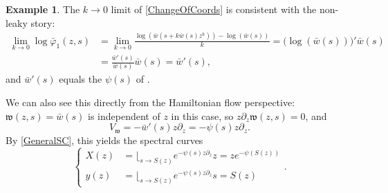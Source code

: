 \documentclass[10pt,a4paper,oneside,no-math,reqno]{amsart}%
\theoremstyle{plain}
\newtheorem{lemma}[theorem]{Lemma}
\theoremstyle{definition}
\newtheorem{example}[theorem]{Example}
\theoremstyle{remark}
\numberwithin{equation}{section}
\renewcommand{\phi}{\varphi}
\newcommand{\mf}[1]{\mathfrak{#1}}
\newcommand{\1}{\mathds{1}}
\newcommand{\<}{\langle}
\renewcommand{\>}{\rangle}
\newcommand{\del}{\partial}
\begin{document}
\begin{example}\label{FindingpsiFork=0}
	The $ k \to 0$ limit of \cref{ChangeOfCoords} is consistent with the non-leaky story:
	\begin{equation}
		\begin{split}
		    \lim_{k \to 0} \log \bar{\phi}_1 ( z, s)
            &=
            \lim_{k \to 0} \frac{\log (\bar{w} (s + k \bar{w}(s)z^k ))  - \log (\bar{w}(s))}{k}
            =
            \big( \log (\bar{w}(s))\big)' \bar{w}(s)
            \\
            &=
            \frac{\bar{w}'(s)}{\bar{w}(s)} \bar{w}(s)
            =
            \bar{w}'(s) ,
		\end{split}
	\end{equation}
	and $ \bar{w}'(s)$ equals the $ \psi(s)$ of \cite{BDKS22}.\par
	We can also see this directly from the Hamiltonian flow perspective: $ \mf{w}(z,s) = \bar{w}(s)$ is independent of $ z$ in this case, so $ z \del_z \mf{w}(z,s) = 0$, and
	\begin{equation}
		V_\mf{w}
		=
		- \bar{w}'(s) z \del_z
		=
		- \psi(s) z \del_z .
	\end{equation}
	By \cref{GeneralSC}, this yields the spectral curves
	\begin{equation}
		\begin{cases}
			X(z) &= \Big\lfloor_{s \to S(z)} e^{- \psi(s) z \del_z } z  = z e^{- \psi(S(z))}
			\\
			y(z) &= \Big\lfloor_{s \to S(z)} e^{- \psi(s) z \del_z } s = S(z)
		\end{cases} .
	\end{equation}
\end{example}

\end{document}
